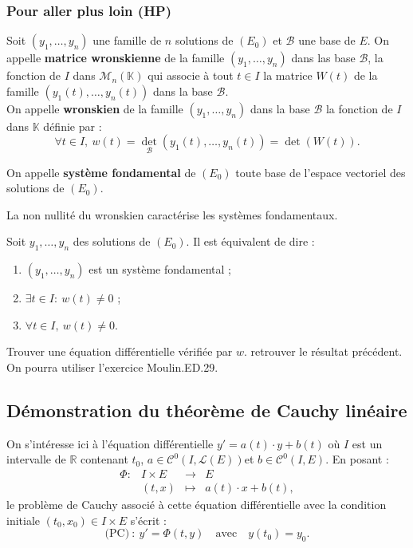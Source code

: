 \documentclass[french]{article}
\newcommand{\R}{\mathbb{R}}
\newcommand{\K}{\mathbb{K}}
\theoremstyle{plain}
\theoremstyle{definition}
\theoremstyle{remark}
\begin{document}
\subsubsection*{Pour aller plus loin (HP)}

\begin{dfn}
	Soit $(y_1,\ldots,y_n)$ une famille de $n$ solutions de $(E_0)$ et $\mathcal{B}$ une base de $E$. On appelle \textbf{matrice wronskienne} de la famille $(y_1,\ldots,y_n)$ dans las base $\mathcal{B}$, la fonction de $I$ dans $\mathcal{M}_n(\K)$ qui associe à tout $t\in I$ la matrice $W(t)$ de la famille $(y_1(t),\ldots,y_n(t))$ dans la base $\mathcal{B}$.\\
	On appelle \textbf{wronskien} de la famille $(y_1,\ldots,y_n)$ dans la base $\mathcal{B}$ la fonction de $I$ dans $\K$ définie par :
	$$\forall t\in I,\ w(t)=\det_{\mathcal{B}}(y_1(t),\ldots,y_n(t))=\det(W(t)).$$
\end{dfn}

\begin{dfn}
	On appelle \textbf{système fondamental} de $(E_0)$ toute base de l'espace vectoriel des solutions de $(E_0)$.
\end{dfn}

La non nullité du wronskien caractérise les systèmes fondamentaux.

\begin{prop}%
	Soit $y_1,\ldots,y_n$ des solutions de $(E_0)$. Il est équivalent de dire :
	\begin{enumerate}[label=(\roman*)]
		\item $(y_1,\ldots,y_n)$ est un système fondamental ;
		\item $\exists t\in I :\ w(t)\ne 0$ ;
		\item $\forall t\in I,\ w(t)\ne 0$. 
	\end{enumerate}
\end{prop}

\begin{exo}
	Trouver une équation différentielle vérifiée par $w$. retrouver le résultat précédent. \\
	On pourra utiliser l'exercice Moulin.ED.29.
\end{exo}

\subsection{Démonstration du théorème de Cauchy linéaire}

On s'intéresse ici à l'équation différentielle $y'=a(t)\cdot y+b(t)$ où $I$ est un intervalle de $\R$ contenant $t_0$, $a\in\mathcal{C}^0(I,\mathcal{L}(E))$et $b\in\mathcal{C}^0(I,E)$. En posant :
$$\begin{array}{lrcl}
	\Phi:&I\times E&\longrightarrow& E\\
	&(t,x)&\longmapsto&a(t)\cdot x+b(t),
\end{array}$$ le problème de Cauchy associé à cette équation différentielle avec la condition initiale $(t_0,x_0)\in I\times E$ s'écrit :
$$\text{(PC)}\ :\ y'=\Phi(t,y)\quad\text{avec}\quad y(t_0)=y_0.$$
\end{document}
